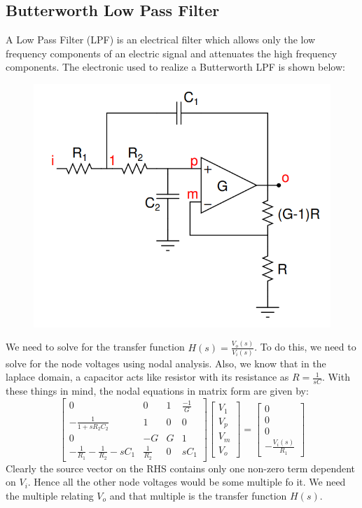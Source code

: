 \documentclass[12pt, a4paper]{article}
\begin{document}
\subsection{Butterworth Low Pass Filter}
A Low Pass Filter (LPF) is an electrical filter which allows only the low frequency components of an electric signal and attenuates the high frequency components. The electronic used to realize a Butterworth LPF is shown below:
\vspace*{-0.5cm}
\begin{figure}[H]
    \centering
    \includegraphics[scale = 0.8]{Figure_blpf.png}
    \label{fig:sample}
\end{figure}
We need to solve for the transfer function $H(s)=\frac{V_{o}(s)}{V_{i}(s)}$. To do this, we need to solve for the node voltages using nodal analysis. Also, we know that in the laplace domain, a capacitor acts like resistor with its resistance as $R=\frac{1}{sC}$.
With these things in mind, the nodal equations in matrix form are given by:
\begin{equation*}
\begin{bmatrix}
    0 & 0 & 1 & \frac{-1}{G}\\
    -\frac{1}{1+sR_{2}C_{2}} & 1 & 0 & 0\\
    0 & -G & G & 1\\
    -\frac{1}{R_{1}}-\frac{1}{R_{2}}-sC_{1} & \frac{1}{R_{2}} & 0 & sC_{1}
\end{bmatrix}
\begin{bmatrix}
    V_{1}\\
    V_{p}\\
    V_{m}\\
    V_{o}
\end{bmatrix}
=
\begin{bmatrix}
    0\\
    0\\
    0\\
    -\frac{V_{i}(s)}{R_{1}}
\end{bmatrix}
\end{equation*}
Clearly the source vector on the RHS contains only one non-zero term dependent on $V_{i}$. Hence all the other node voltages would be some multiple fo it. We need the multiple relating $V_{o}$ and that multiple is the transfer function $H(s)$.
\end{document}
